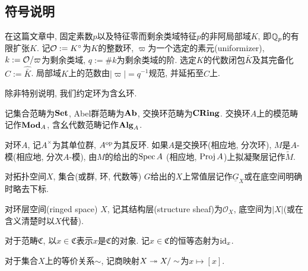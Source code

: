 

\subsection*{符号说明}
在这篇文章中, 固定素数$p$以及特征零而剩余类域特征$p$的非阿局部域$K$, 即$\mathbb{Q}_p$的有限扩张$K$.
记$\mathcal{O} := K^\circ$为$K$的整数环, $\varpi$为一个选定的素元(uniformizer), $k := \mathcal{O}/\varpi$为剩余类域, $q := \#k$为剩余类域的阶.
选定$K$的代数闭包$\bar{K}$及其完备化$C := \hat{\bar{K}}$.
局部域$K$上的范数由$|\varpi| = q^{-1}$规范, 并延拓至$C$上.


除非特别说明, 我们约定环为含幺环.

记集合范畴为$\mathbf{Set}$, Abel群范畴为$\mathbf{Ab}$, 交换环范畴为$\mathbf{CRing}$. 交换环$A$上的模范畴记作$\mathbf{Mod}_A$, 含幺代数范畴记作$\mathbf{Alg}_A$.

对环$A$, 记$A^\times$为其单位群, $A^{\mathrm{op}}$为其反环. 如果$A$是交换环(相应地, 分次环), $M$是$A$-模(相应地, 分次$A$-模), 由$M$的给出的$\operatorname{Spec} A$ (相应地, $\operatorname{Proj} A$)上拟凝聚层记作$\tilde{M}$.

对拓扑空间$X$, 集合(或群, 环, 代数等) $G$给出的$X$上常值层记作$\underline{G}_X$或在底空间明确时略去下标.

对环层空间(ringed space) $X$, 记其结构层(structure sheaf)为$\mathscr O_X$, 底空间为$|X|$(或在含义清楚时以$X$代替).

对于范畴$\mathfrak{C}$, 以$x\in\mathfrak{C}$表示$x$是$\mathfrak{C}$的对象.
记$x\in\mathfrak{C}$的恒等态射为$\operatorname{id}_x$.

对于集合$X$上的等价关系$\sim$, 记商映射$X\twoheadrightarrow X/\sim$为$x\mapsto [x]$.